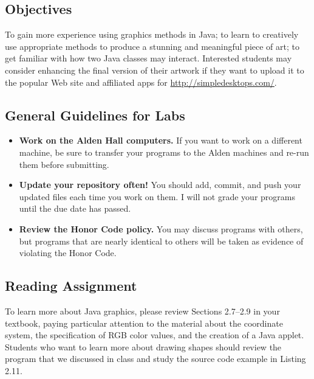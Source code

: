 



\subsection*{Objectives}
\vspace{-0.05in}

To gain more experience using graphics methods in Java; to learn to creatively use appropriate methods to produce a
stunning and meaningful piece of art; to get familiar with how two Java classes may interact. Interested students may
consider enhancing the final version of their artwork if they want to upload it to the popular Web site and affiliated
apps for \url{http://simpledesktops.com/}.

\vspace{-0.1in}
\subsection*{General Guidelines for Labs}
\vspace{-0.05in}
\begin{itemize}
\item
{\bf Work on the Alden Hall computers.} If you want to work on a different
machine, be sure to transfer your programs to the Alden
machines and re-run them before submitting.
\item
{\bf Update your repository often!} You should add, commit,
and push your updated files each time you work on them.  I will not grade
your programs until the due date has passed.
\item
{\bf Review the Honor Code policy.} You
may discuss programs with others, but programs that are nearly identical
to others will be taken as evidence of violating the Honor Code.
\end{itemize}

\vspace{-0.15in}
\subsection*{Reading Assignment}
\vspace{-0.05in}

To learn more about Java graphics, please review Sections 2.7--2.9 in your textbook, paying particular attention to the
material about the coordinate system, the specification of RGB color values, and the creation of a Java applet. Students
who want to learn more about drawing shapes should review the program that we discussed in class and study the source
code example in Listing 2.11.

